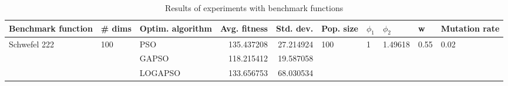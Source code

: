 \begin{table}
\centering
\caption{Results of experiments with benchmark functions}
\begin{tabular}{lllrrlllll}
\toprule
           Benchmark function &              \# dims & Optim. algorithm &  Avg. fitness &  Std. dev. &            Pop. size &         $\phi_{1}$ &               $\phi_{2}$ &                     w &         Mutation rate \\
\midrule
\multirow{3}{*}{Schwefel 222} & \multirow{3}{*}{100} &              PSO &    135.437208 &  27.214924 & \multirow{3}{*}{100} & \multirow{3}{*}{1} & \multirow{3}{*}{1.49618} & \multirow{3}{*}{0.55} & \multirow{3}{*}{0.02} \\
                              &                      &            GAPSO &    118.215412 &  19.587058 &                      &                    &                          &                       &                       \\
                              &                      &          LOGAPSO &    133.656753 &  68.030534 &                      &                    &                          &                       &                       \\
\bottomrule
\end{tabular}
\end{table}
